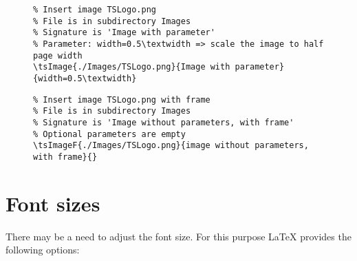 
\begin{figure}[H]
    \small
    \centering
    \begin{BVerbatim}
\tsImage{./Images/TSLogo.png}{Image with parameter}{width=0.5\textwidth}
    \end{BVerbatim}
\end{figure}


\begin{figure}[H]
    \small
    \centering
    \begin{BVerbatim}
\tsImageF{./Images/TSLogo.png}{image without parameters, with frame}{}
    \end{BVerbatim}
\end{figure}


\section{Font sizes}
\label{sec:Font sizes}

There may be a need to adjust the font size. For this purpose \LaTeX{} provides
the following options:

